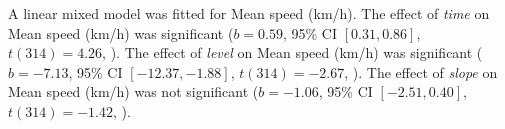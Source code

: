 A linear mixed model was fitted for Mean speed (km/h).
The effect of \textit{time} on Mean speed (km/h) was significant ($b = 0.59$, 95\% CI $[0.31, 0.86]$, $t(314) = 4.26$, ).
The effect of \textit{level} on Mean speed (km/h) was significant ($b = -7.13$, 95\% CI $[-12.37, -1.88]$, $t(314) = -2.67$, ).
The effect of \textit{slope} on Mean speed (km/h) was not significant ($b = -1.06$, 95\% CI $[-2.51, 0.40]$, $t(314) = -1.42$, ).
